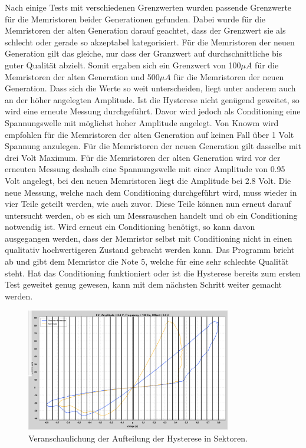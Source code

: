 Nach einige Tests mit verschiedenen Grenzwerten wurden passende Grenzwerte für die Memristoren beider Generationen gefunden. Dabei wurde für die Memristoren der alten Generation darauf geachtet, dass der Grenzwert sie als schlecht oder gerade so akzeptabel kategorisiert. Für die Memristoren der neuen Generation gilt das gleiche, nur dass der Granzwert auf durchschnittliche bis guter Qualität abzielt. Somit ergaben sich ein Grenzwert von 100$\mu A$ für die Memristoren der alten Generation und 500$\mu A$ für die Memristoren der neuen Generation. Dass sich die Werte so weit unterscheiden, liegt unter anderem auch an der höher angelegten Amplitude. Ist die Hysterese nicht genügend geweitet, so wird eine erneute Messung durchgeführt. Davor wird jedoch als Conditioning eine Spannungswelle mit möglichst hoher Amplitude angelegt. Von Knowm wird empfohlen für die Memristoren der alten Generation auf keinen Fall über 1 Volt Spannung anzulegen. Für die Memristoren der neuen Generation gilt dasselbe mit drei Volt Maximum. Für die Memristoren der alten Generation wird vor der erneuten Messung deshalb eine Spannungswelle mit einer Amplitude von 0.95 Volt angelegt, bei den neuen Memristoren liegt die Amplitude bei 2.8 Volt. Die neue Messung, welche nach dem Conditioning durchgeführt wird, muss wieder in vier Teile geteilt werden, wie auch zuvor. Diese Teile können nun erneut darauf untersucht werden, ob es sich um Messrauschen handelt und ob ein Conditioning notwendig ist. Wird erneut ein Conditioning benötigt, so kann davon ausgegangen werden, dass der Memristor selbst mit Conditioning nicht in einen qualitativ hochwertigeren Zustand gebracht werden kann. Das Programm bricht ab und gibt dem Memristor die Note 5, welche für eine sehr schlechte Qualität steht. Hat das Conditioning funktioniert oder ist die Hysterese bereits zum ersten Test geweitet genug gewesen, kann mit dem nächsten Schritt weiter gemacht werden.

\begin{figure}
  \centering
    \includegraphics[width=0.8\textwidth]{images/Hysteresen_Sektoren.png}
  \caption{Veranschaulichung der Aufteilung der Hysterese in Sektoren.}
  \label{fig:Hysteresen_Sektoren}
\end{figure}


